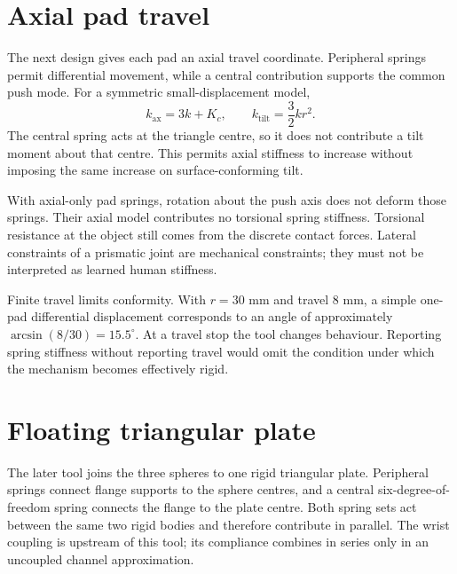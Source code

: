 \section{Axial pad travel}

The next design gives each pad an axial travel coordinate. Peripheral springs permit differential movement, while a central contribution supports the common push mode. For a symmetric small-displacement model,
\begin{equation}
k_{\mathrm{ax}}=3k+K_c,\qquad
k_{\mathrm{tilt}}=\frac32kr^2.
\label{eq:rail-stiffness}
\end{equation}
The central spring acts at the triangle centre, so it does not contribute a tilt moment about that centre. This permits axial stiffness to increase without imposing the same increase on surface-conforming tilt.

With axial-only pad springs, rotation about the push axis does not deform those springs. Their axial model contributes no torsional spring stiffness. Torsional resistance at the object still comes from the discrete contact forces. Lateral constraints of a prismatic joint are mechanical constraints; they must not be interpreted as learned human stiffness.

Finite travel limits conformity. With $r=30$ mm and travel $8$ mm, a simple one-pad differential displacement corresponds to an angle of approximately $\arcsin(8/30)=15.5^\circ$. At a travel stop the tool changes behaviour. Reporting spring stiffness without reporting travel would omit the condition under which the mechanism becomes effectively rigid.

\section{Floating triangular plate}

The later tool joins the three spheres to one rigid triangular plate. Peripheral springs connect flange supports to the sphere centres, and a central six-degree-of-freedom spring connects the flange to the plate centre. Both spring sets act between the same two rigid bodies and therefore contribute in parallel. The wrist coupling is upstream of this tool; its compliance combines in series only in an uncoupled channel approximation.

